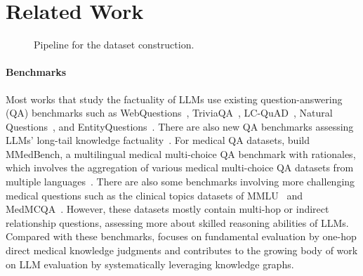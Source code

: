 \section{Related Work}
\begin{figure*}[!ht]
    \centering
    \vspace{-1em}
    \caption{Pipeline for the \mkj dataset construction.}
    \label{fig:pipeline}
    \vspace{-1em}
\end{figure*}


\paragraph{Benchmarks} Most works that study the factuality of LLMs use existing question-answering (QA) benchmarks such as WebQuestions~\cite{berant2013semantic}, TriviaQA~\cite{joshi2017triviaqa}, LC-QuAD~\cite{trivedi2017lc, dubey2019lc}, Natural Questions~\cite{kwiatkowski2019natural}, and EntityQuestions~\cite{sciavolino2021simple}. 
There are also new QA benchmarks assessing LLMs' long-tail knowledge factuality~\cite{mallen2023not, kumar2024automatic}. 
For medical QA datasets, \citet{qiu2024towards} build MMedBench, a multilingual medical multi-choice QA benchmark with rationales, which involves the aggregation of various medical multi-choice QA datasets from multiple languages~\cite{jin2021disease, kasai2023evaluating, labrak-etal-2022-frenchmedmcqa, vilares-gomez-rodriguez-2019-head, blinov2022rumedbench}. 
There are also some benchmarks involving more challenging medical questions such as the clinical topics datasets of MMLU~\cite{hendrycks2020measuring} and MedMCQA~\cite{pal2022medmcqa, malaviya-etal-2024-expertqa}. However, these datasets mostly contain multi-hop or indirect relationship questions, assessing more about skilled reasoning abilities of LLMs.
Compared with these benchmarks, \mkj{} focuses on fundamental evaluation by one-hop direct medical knowledge judgments and contributes to the growing body of work on LLM evaluation by systematically leveraging knowledge graphs.




